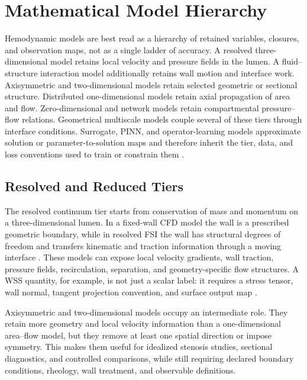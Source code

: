 \section{Mathematical Model Hierarchy}
\label{sec:model-hierarchy}

Hemodynamic models are best read as a hierarchy of retained variables,
closures, and observation maps, not as a single ladder of accuracy. A resolved
three-dimensional model retains local velocity and pressure fields in the lumen.
A fluid--structure interaction model additionally retains wall motion and
interface work. Axisymmetric and two-dimensional models retain selected
geometric or sectional structure. Distributed one-dimensional models retain
axial propagation of area and flow. Zero-dimensional and network models retain
compartmental pressure--flow relations. Geometrical multiscale models couple
several of these tiers through interface conditions. Surrogate, PINN, and
operator-learning models approximate solution or parameter-to-solution maps and
therefore inherit the tier, data, and loss conventions used to train or
constrain them
\cite{QuarteroniFormaggia2004CardiovascularModeling,FormaggiaEtAl2003OneDimensionalBloodFlow,ShiEtAl2011BloodFlowModelReview,KopplHelmig2023DimensionReducedModeling}.

\subsection{Resolved and Reduced Tiers}
\label{subsec:resolved-reduced-model-tiers}

The resolved continuum tier starts from conservation of mass and momentum on a
three-dimensional lumen. In a fixed-wall CFD model the wall is a prescribed
geometric boundary, while in resolved FSI the wall has structural degrees of
freedom and transfers kinematic and traction information through a moving
interface \cite{QuarteroniFormaggia2004CardiovascularModeling,FormaggiaEtAl2007FSICoupling}.
These models can expose local velocity gradients, wall traction, pressure
fields, recirculation, separation, and geometry-specific flow structures. A WSS
quantity, for example, is not just a scalar label: it requires a stress tensor,
wall normal, tangent projection convention, and surface output map
\cite{JohnEtAl2017WallShearStressVectorForm}.

Axisymmetric and two-dimensional models occupy an intermediate role. They retain
more geometry and local velocity information than a one-dimensional area--flow
model, but they remove at least one spatial direction or impose symmetry. This
makes them useful for idealized stenosis studies, sectional diagnostics, and
controlled comparisons, while still requiring declared boundary conditions,
rheology, wall treatment, and observable definitions.

